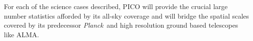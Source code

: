 \documentclass[PICOReport.tex]{subfiles}
\begin{document}
For each of the science cases described, PICO will provide the crucial large number statistics afforded by its all-sky coverage and will bridge the spatial scales covered by its predecessor {\em Planck}~and high resolution ground based telescopes like ALMA.



%
%
\end{document}
